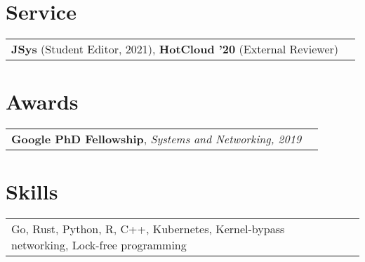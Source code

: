 \documentclass[margin,line]{res}
\begin{document}
\begin{resume}
\section{\sc Service}
\begin{tabular}{@{}p{5.5in}p{4in}}
{\bf JSys} {\small (Student Editor, 2021)}, {\bf HotCloud '20} {\small
(External Reviewer)}\\
\end{tabular}

\section{\sc Awards}
\begin{tabular}{@{}p{5.5in}p{4in}}
{\bf Google PhD Fellowship}, {\small\em Systems and Networking, 2019}\\
\end{tabular}

\section{\sc Skills}
\begin{tabular}{@{}p{5.5in}p{4in}}
Go, Rust, Python, R, C++, Kubernetes, Kernel-bypass networking, Lock-free programming
\end{tabular}

\end{resume}
\end{document}
